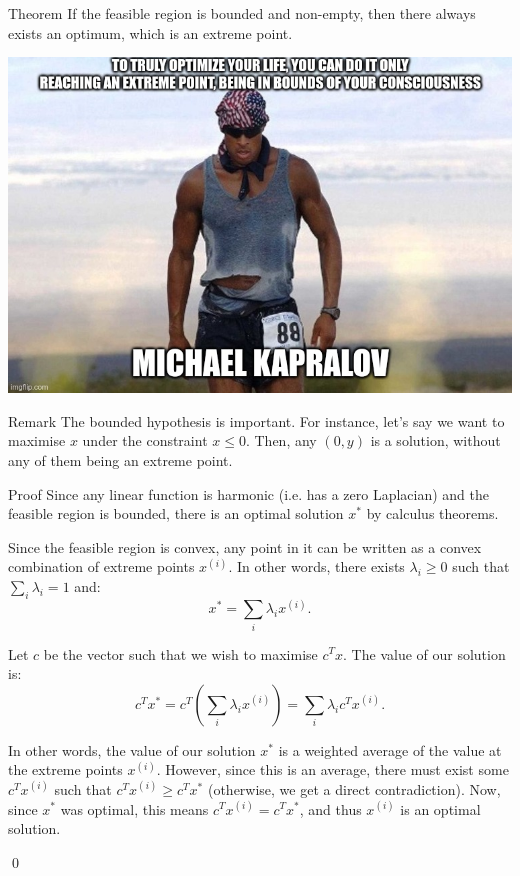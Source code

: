 \documentclass[a4paper]{article}
\begin{document}
\begin{parag}{Theorem}
    If the feasible region is bounded and non-empty, then there always exists an optimum, which is an extreme point.

    \begin{center}
        \includegraphics[scale=0.3]{9hjhow.jpg}
    \end{center}


    \begin{subparag}{Remark}
        The bounded hypothesis is important. For instance, let's say we want to maximise $x$ under the constraint $x \leq 0$. Then, any $\left(0, y\right)$ is a solution, without any of them being an extreme point.
    \end{subparag}

    \begin{subparag}{Proof}
        Since any linear function is harmonic (i.e. has a zero Laplacian) and the feasible region is bounded, there is an optimal solution $x^*$ by calculus theorems.

        Since the feasible region is convex, any point in it can be written as a convex combination of extreme points $x^{\left(i\right)}$. In other words, there exists $\lambda_i \geq 0$ such that $\sum_{i} \lambda_i = 1$ and:
        \[x^* = \sum_{i} \lambda_i x^{\left(i\right)}.\]

        Let $c$ be the vector such that we wish to maximise $c^T x$. The value of our solution is:  
        \[c^T x^* = c^T \left(\sum_{i} \lambda_i x^{\left(i\right)}\right) = \sum_i \lambda_i c^T x^{\left(i\right)}.\]

        In other words, the value of our solution $x^*$ is a weighted average of the value at the extreme points $x^{\left(i\right)}$. However, since this is an average, there must exist some $c^T x^{\left(i\right)}$ such that $c^T x^{\left(i\right)} \geq c^T x^*$ (otherwise, we get a direct contradiction). Now, since $x^*$ was optimal, this means $c^T x^{\left(i\right)} = c^T x^*$, and thus $x^{\left(i\right)}$ is an optimal solution.

        \qed
    \end{subparag}
\end{parag}
\end{document}
